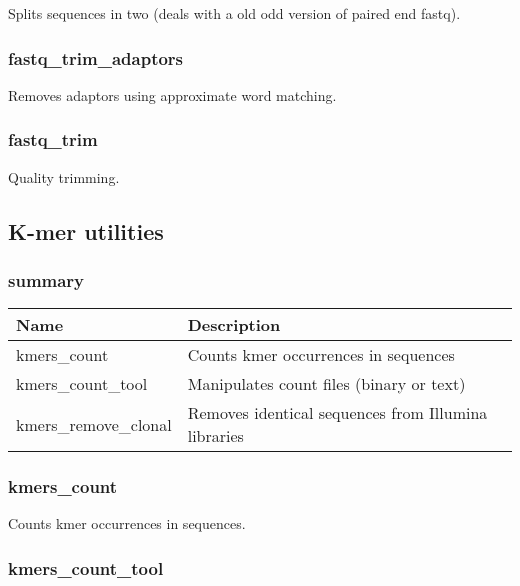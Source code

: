 \documentclass[a4paper,12pt]{article}
\begin{document}
Splits sequences in two (deals with a old odd version of paired end fastq).

\subsubsection{fastq\_trim\_adaptors}

Removes adaptors using approximate word matching.

\subsubsection{fastq\_trim}

Quality trimming.


\subsection{K-mer utilities}

\subsubsection{summary}

\begin{tabularx}{\textwidth}{|X|X|}
    \hline
    \textbf{Name}                   & \textbf{Description} \\
    \hline
    \hline
    kmers\_count                    & Counts kmer occurrences in sequences \\
    kmers\_count\_tool              & Manipulates count files (binary or text) \\
    kmers\_remove\_clonal           & Removes identical sequences from Illumina libraries \\
    \hline
\end{tabularx}

\subsubsection{kmers\_count}

Counts kmer occurrences in sequences.

\subsubsection{kmers\_count\_tool}
\end{document}
